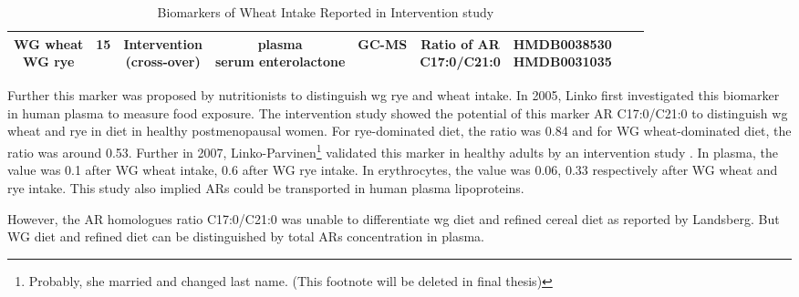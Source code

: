 \begin{table}[h!]
{\begin{tabular}{|c|c|c|c|c|c|c|c|c|}
			\makecell{WG wheat\\WG rye} & 15 & \makecell{Intervention\\ (cross-over)} & \makecell{plasma\\serum enterolactone} & GC-MS & \makecell{Ratio of AR\\C17:0/C21:0} & \makecell{HMDB0038530\\HMDB0031035} &\cite{10.1093/jn/137.5.1137} \\ 
			\hline 
			
			
	\end{tabular} }
	\caption{Biomarkers of Wheat Intake Reported in Intervention study}
	\label{table:wheat_intervention}
\end{table}

Further this marker was proposed by nutritionists to distinguish \acrshort{wg} rye and wheat intake. In 2005, Linko\cite{ISI:000376712600013} first investigated this biomarker in human plasma to measure food exposure. The intervention study showed the potential of this marker AR C17:0/C21:0 to distinguish \acrshort{wg} wheat and rye in diet in healthy postmenopausal women. 
For rye-dominated diet, the ratio was 0.84 and for WG wheat-dominated diet, the ratio was around 0.53. 
Further in 2007, Linko-Parvinen\footnote{Probably, she married and changed last name. (This footnote will be deleted in final thesis)} validated this marker in healthy adults by an intervention study \cite{10.1093/jn/137.5.1137}.
In plasma, the value was 0.1 after WG wheat intake, 0.6 after WG rye intake. In erythrocytes, the value was 0.06, 0.33 respectively after WG wheat and rye intake. This study also implied ARs could be transported in human plasma lipoproteins.

However, the AR homologues ratio C17:0/C21:0 was unable to differentiate \acrshort{wg} diet and refined cereal diet as reported by Landsberg\cite{ISI:000255012000007}. But WG diet and refined diet can be distinguished by total ARs concentration in plasma.

